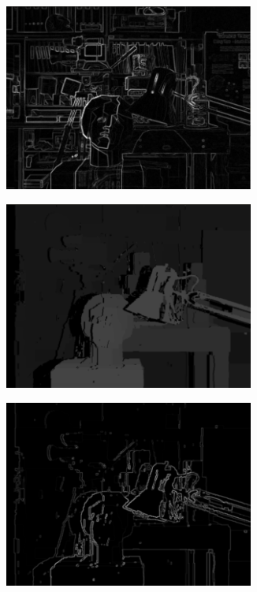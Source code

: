 \begin{figure}[h!]
\begin{subfigure}[]{0.4\textwidth}
\caption{\label{fig:wr}}
\end{subfigure}
\begin{subfigure}[]{0.4\textwidth}
\centering
\includegraphics[width=0.9\textwidth]{./img/right_sobel.png}
\caption{\label{fig:rws}}
\end{subfigure}
\begin{subfigure}[]{0.4\textwidth}
\centering
\includegraphics[width=0.9\textwidth]{./img/ldisp.png}
\caption{\label{fig:ld}}
\end{subfigure}
\begin{subfigure}[]{0.4\textwidth}
\centering
\includegraphics[width=0.9\textwidth]{./img/ldisp_sobel.png}

\end{subfigure}
\end{figure}
